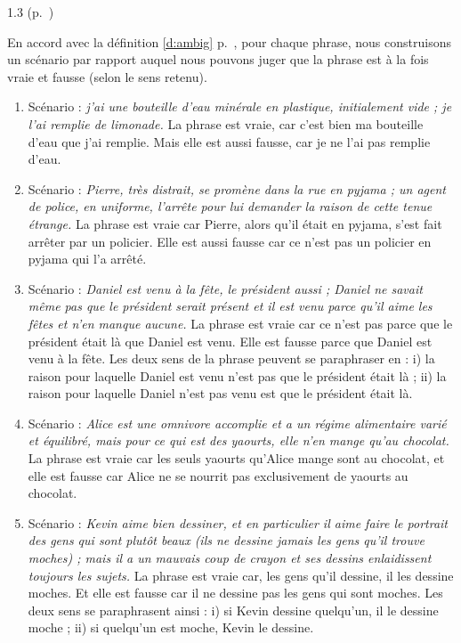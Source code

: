 \begin{Solution}{1.{3}}
(p.~\pageref{exo:1Ambig})\label{crg:1Ambig}

En accord avec la définition \ref{d:ambig} p.~\pageref{d:ambig}, pour chaque phrase, nous construisons un scénario par rapport auquel nous pouvons juger que la phrase est à la fois vraie et fausse (selon le sens retenu).
\begin{enumerate}
\item %
Scénario : \emph{j'ai une bouteille d'eau minérale en plastique, initialement vide ; je l'ai remplie de limonade.} %
La phrase est vraie, car c'est bien ma bouteille d'eau que j'ai remplie.  Mais elle est aussi fausse, car je ne l'ai pas remplie d'eau.
\item %
Scénario : \emph{Pierre, très distrait, se promène dans la rue en pyjama ; un agent de police, en uniforme, l'arrête pour lui demander la raison de cette tenue étrange.} %
La phrase est vraie car Pierre, alors qu'il était en pyjama, s'est fait arrêter par un policier. Elle est aussi fausse car ce n'est pas un policier en pyjama qui l'a arrêté.
\item %
Scénario : \emph{Daniel est venu à la fête, le président aussi ; Daniel ne savait même pas que le président serait présent et il est venu parce qu'il aime les fêtes et n'en manque aucune.}
La phrase est vraie car ce n'est pas parce que le président était là que Daniel est venu.  Elle est fausse parce que Daniel est venu à la fête.  Les deux sens de la phrase peuvent se paraphraser en : i) la raison pour laquelle Daniel est venu n'est pas que le président était là ; ii) la raison pour laquelle Daniel n'est pas venu est que le président était là.
\item %
Scénario : \emph{Alice est une omnivore accomplie et a un régime alimentaire varié et équilibré, mais pour ce qui est des yaourts, elle n'en mange qu'au chocolat.}
La phrase est vraie car les seuls yaourts qu'Alice mange sont au chocolat, et elle est fausse car Alice ne se nourrit pas exclusivement de yaourts au chocolat.
\item %
Scénario : \emph{Kevin aime bien dessiner, et en particulier il aime faire le portrait des gens qui sont plutôt beaux (ils ne dessine jamais les gens qu'il trouve moches) ; mais il a un mauvais coup de crayon et ses dessins enlaidissent toujours les sujets.}
La phrase est vraie car, les gens qu'il dessine, il les dessine moches. Et elle est fausse car il ne dessine pas les gens qui sont moches.  Les deux sens se paraphrasent ainsi : i) si Kevin dessine quelqu'un, il le dessine moche ; ii) si quelqu'un est moche, Kevin le dessine.
\end{enumerate}
\end{Solution}
